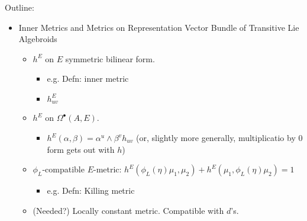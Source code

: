 {
\color{gray}
    Outline:
    
    \begin{itemize}
    
    \item Inner Metrics and Metrics on Representation Vector Bundle of Transitive Lie Algebroids
    
        \begin{itemize}
            
        \item $h^E$ on $E$ symmetric bilinear form.
        
            \begin{itemize}
                
            \item e.g. Defn: inner metric
            
            \item $h^E_{uv}$
                
            \end{itemize}
        
        \item $h^E$ on $\Omega^\bullet (A, E)$.
            
            \begin{itemize}
                
            \item $h^E(\alpha, \beta) = \alpha^u \wedge \beta^v h_{uv}$ (or, slightly more generally, multiplicatio by $0$ form gets out with $h$)
                
            \end{itemize}
            
        \item $\phi_L$-compatible $E$-metric: $h^E(\phi_L(\eta) \mu_1, \mu_2) + h^E(\mu_1, \phi_L(\eta)\mu_2) = 1$
        
            \begin{itemize}
                
            \item e.g. Defn: Killing metric
                
            \end{itemize}
        
        \item (Needed?) Locally constant metric. Compatible with $d$'s.
        
        \end{itemize}
    

\end{itemize}}
